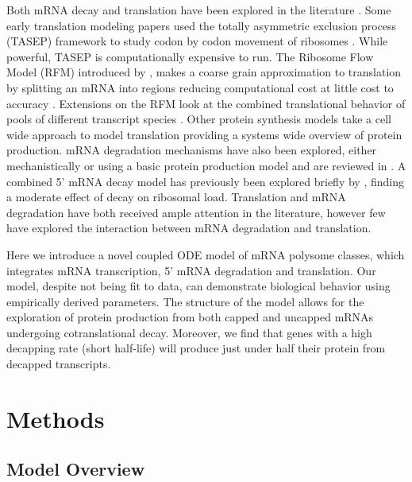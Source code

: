 \documentclass[a4,center,fleqn,nocrop]{NAR}
\begin{document}
Both mRNA decay and translation have been explored in the literature \citep{RN11, RN12}. Some early translation modeling papers used the totally asymmetric exclusion process (TASEP) framework to study codon by codon movement of ribosomes \citep{RN13,RN14}. While powerful, TASEP is computationally expensive to run. The Ribosome Flow Model (RFM) introduced by \citep{RN15}, makes a coarse grain approximation to translation by splitting an mRNA into regions reducing computational cost at little cost to accuracy \citep{RN15}. Extensions on the RFM look at the combined translational behavior of pools of different transcript species \citep{RN16}. Other protein synthesis models take a cell wide approach to model translation \citep{RN17} providing a systems wide overview of protein production. mRNA degradation mechanisms have also been explored, either mechanistically \citep{RN18,RN19} or using a basic protein production model \citep{RN20} and are reviewed in \citep{RN21,RN22}. A combined 5' mRNA decay model has previously been explored briefly by \citep{RN22}, finding a moderate effect of decay on ribosomal load. Translation and mRNA degradation have both received ample attention in the literature, however few have explored the interaction between mRNA degradation and translation.


Here we introduce a novel coupled ODE model of mRNA polysome classes, which integrates mRNA transcription, 5' mRNA degradation and translation. Our model, despite not being fit to data, can demonstrate biological behavior using empirically derived parameters. The structure of the model allows for the exploration of protein production from both capped and uncapped mRNAs undergoing cotranslational decay. Moreover, we find that genes with a high decapping rate (short half-life) will produce just under half their protein from decapped transcripts. 

\section{Methods}\label{sec:description}
\subsection{Model Overview}
\end{document}
